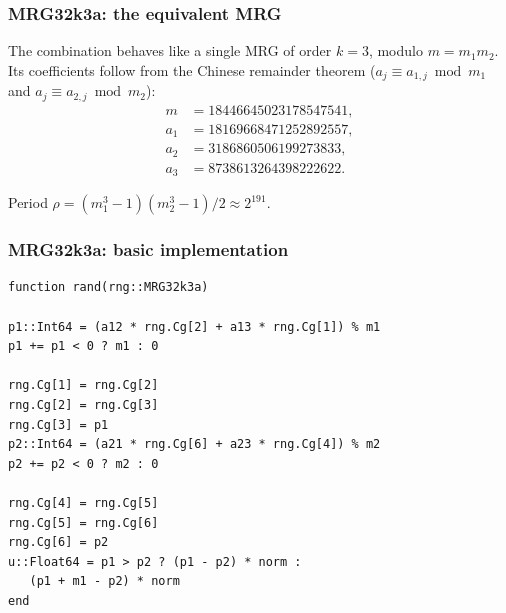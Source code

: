 \documentclass[aspectratio=169]{beamer}
\begin{document}
	\begin{frame}
		\frametitle{MRG32k3a: the equivalent MRG}
		
		The combination behaves like a single MRG of order $k = 3$, modulo
		$m = m_1 m_2$. Its coefficients follow from the Chinese remainder theorem
		($a_j \equiv a_{1,j} \bmod m_1$ and $a_j \equiv a_{2,j} \bmod m_2$):
		\[
		\begin{array}{rl}
		m   &= 18446645023178547541,\\[2pt]
		a_1 &= 18169668471252892557,\\[2pt]
		a_2 &= 3186860506199273833,\\[2pt]
		a_3 &= 8738613264398222622.
		\end{array}
		\]
		
		\medskip
		
		Period $\rho = (m_1^3-1)(m_2^3-1)/2 \approx 2^{191}$.
	\end{frame}
	
	\begin{frame}[containsverbatim]
		\frametitle{MRG32k3a: basic implementation}
		
		\begin{footnotesize}
			\begin{verbatim}
function rand(rng::MRG32k3a)

p1::Int64 = (a12 * rng.Cg[2] + a13 * rng.Cg[1]) % m1
p1 += p1 < 0 ? m1 : 0

rng.Cg[1] = rng.Cg[2]
rng.Cg[2] = rng.Cg[3]
rng.Cg[3] = p1
p2::Int64 = (a21 * rng.Cg[6] + a23 * rng.Cg[4]) % m2
p2 += p2 < 0 ? m2 : 0

rng.Cg[4] = rng.Cg[5]
rng.Cg[5] = rng.Cg[6]
rng.Cg[6] = p2
u::Float64 = p1 > p2 ? (p1 - p2) * norm :
   (p1 + m1 - p2) * norm
end
			\end{verbatim}
			\end{footnotesize}
			
		\end{frame}
\end{document}
